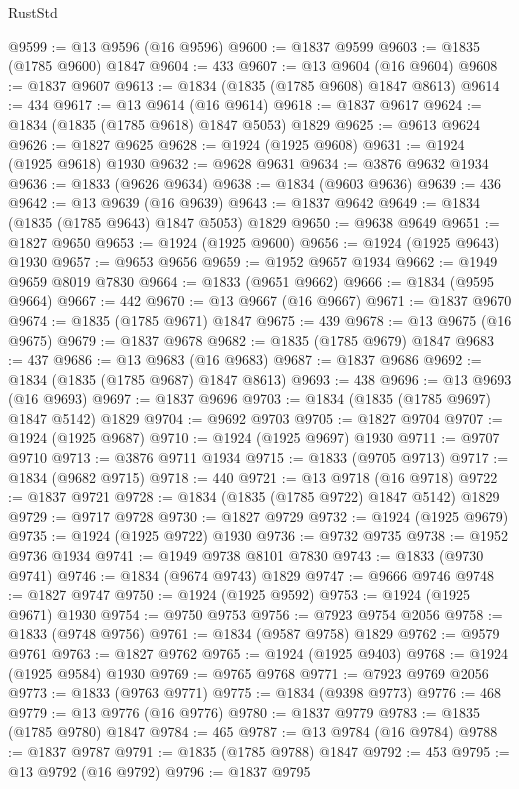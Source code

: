 \begin{lexlean}{RustStd}
\begin{coremodule}
@9599 := @13 @9596 (@16 @9596)
@9600 := @1837 @9599
@9603 := @1835 (@1785 @9600) @1847
@9604 := 433
@9607 := @13 @9604 (@16 @9604)
@9608 := @1837 @9607
@9613 := @1834 (@1835 (@1785 @9608) @1847 @8613)
@9614 := 434
@9617 := @13 @9614 (@16 @9614)
@9618 := @1837 @9617
@9624 := @1834 (@1835 (@1785 @9618) @1847 @5053) @1829
@9625 := @9613 @9624
@9626 := @1827 @9625
@9628 := @1924 (@1925 @9608)
@9631 := @1924 (@1925 @9618) @1930
@9632 := @9628 @9631
@9634 := @3876 @9632 @1934
@9636 := @1833 (@9626 @9634)
@9638 := @1834 (@9603 @9636)
@9639 := 436
@9642 := @13 @9639 (@16 @9639)
@9643 := @1837 @9642
@9649 := @1834 (@1835 (@1785 @9643) @1847 @5053) @1829
@9650 := @9638 @9649
@9651 := @1827 @9650
@9653 := @1924 (@1925 @9600)
@9656 := @1924 (@1925 @9643) @1930
@9657 := @9653 @9656
@9659 := @1952 @9657 @1934
@9662 := @1949 @9659 @8019 @7830
@9664 := @1833 (@9651 @9662)
@9666 := @1834 (@9595 @9664)
@9667 := 442
@9670 := @13 @9667 (@16 @9667)
@9671 := @1837 @9670
@9674 := @1835 (@1785 @9671) @1847
@9675 := 439
@9678 := @13 @9675 (@16 @9675)
@9679 := @1837 @9678
@9682 := @1835 (@1785 @9679) @1847
@9683 := 437
@9686 := @13 @9683 (@16 @9683)
@9687 := @1837 @9686
@9692 := @1834 (@1835 (@1785 @9687) @1847 @8613)
@9693 := 438
@9696 := @13 @9693 (@16 @9693)
@9697 := @1837 @9696
@9703 := @1834 (@1835 (@1785 @9697) @1847 @5142) @1829
@9704 := @9692 @9703
@9705 := @1827 @9704
@9707 := @1924 (@1925 @9687)
@9710 := @1924 (@1925 @9697) @1930
@9711 := @9707 @9710
@9713 := @3876 @9711 @1934
@9715 := @1833 (@9705 @9713)
@9717 := @1834 (@9682 @9715)
@9718 := 440
@9721 := @13 @9718 (@16 @9718)
@9722 := @1837 @9721
@9728 := @1834 (@1835 (@1785 @9722) @1847 @5142) @1829
@9729 := @9717 @9728
@9730 := @1827 @9729
@9732 := @1924 (@1925 @9679)
@9735 := @1924 (@1925 @9722) @1930
@9736 := @9732 @9735
@9738 := @1952 @9736 @1934
@9741 := @1949 @9738 @8101 @7830
@9743 := @1833 (@9730 @9741)
@9746 := @1834 (@9674 @9743) @1829
@9747 := @9666 @9746
@9748 := @1827 @9747
@9750 := @1924 (@1925 @9592)
@9753 := @1924 (@1925 @9671) @1930
@9754 := @9750 @9753
@9756 := @7923 @9754 @2056
@9758 := @1833 (@9748 @9756)
@9761 := @1834 (@9587 @9758) @1829
@9762 := @9579 @9761
@9763 := @1827 @9762
@9765 := @1924 (@1925 @9403)
@9768 := @1924 (@1925 @9584) @1930
@9769 := @9765 @9768
@9771 := @7923 @9769 @2056
@9773 := @1833 (@9763 @9771)
@9775 := @1834 (@9398 @9773)
@9776 := 468
@9779 := @13 @9776 (@16 @9776)
@9780 := @1837 @9779
@9783 := @1835 (@1785 @9780) @1847
@9784 := 465
@9787 := @13 @9784 (@16 @9784)
@9788 := @1837 @9787
@9791 := @1835 (@1785 @9788) @1847
@9792 := 453
@9795 := @13 @9792 (@16 @9792)
@9796 := @1837 @9795

\end{coremodule}
\end{lexlean}

